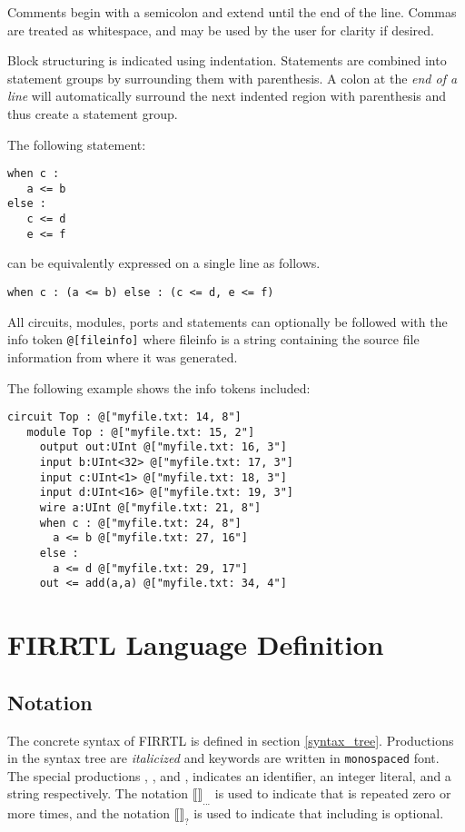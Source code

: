 \documentclass[12pt]{article}
\begin{document}
Comments begin with a semicolon and extend until the end of the line. Commas are treated as whitespace, and may be used by the user for clarity if desired.

Block structuring is indicated using indentation. Statements are combined into statement groups by surrounding them with parenthesis. A colon at the {\em end of a line} will automatically surround the next indented region with parenthesis and thus create a statement group.

The following statement:
\begin{lstlisting}
when c :
   a <= b
else :
   c <= d
   e <= f
\end{lstlisting}
can be equivalently expressed on a single line as follows.
\begin{lstlisting}
when c : (a <= b) else : (c <= d, e <= f)
\end{lstlisting}

All circuits, modules, ports and statements can optionally be followed with the info token \verb|@[fileinfo]| where fileinfo is a string containing the source file information from where it was generated.

The following example shows the info tokens included:

\begin{lstlisting}
circuit Top : @["myfile.txt: 14, 8"] 
   module Top : @["myfile.txt: 15, 2"]
     output out:UInt @["myfile.txt: 16, 3"]
     input b:UInt<32> @["myfile.txt: 17, 3"]
     input c:UInt<1> @["myfile.txt: 18, 3"]
     input d:UInt<16> @["myfile.txt: 19, 3"]
     wire a:UInt @["myfile.txt: 21, 8"]
     when c : @["myfile.txt: 24, 8"]
       a <= b @["myfile.txt: 27, 16"]
     else :
       a <= d @["myfile.txt: 29, 17"]
     out <= add(a,a) @["myfile.txt: 34, 4"]
\end{lstlisting}

\section{FIRRTL Language Definition}
\newcommand{\pipe}{\textbar}
\newcommand{\opt}[1]{$\llbracket$#1$\rrbracket_?$}
\newcommand{\rpt}[1]{$\llbracket$#1$\rrbracket_{...}$}
\subsection{Notation}
The concrete syntax of FIRRTL is defined in section \ref{syntax_tree}. Productions in the syntax tree are {\em italicized} and keywords are written in \verb|monospaced| font. The special productions , , and , indicates an identifier, an integer literal, and a string respectively. The notation \rpt{} is used to indicate that  is repeated zero or more times, and the notation \opt{} is used to indicate that including  is optional.
\end{document}
